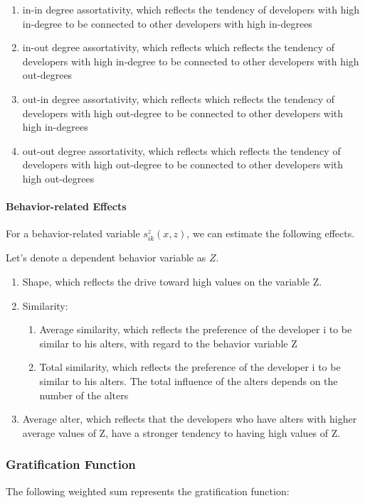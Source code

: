 \documentclass[11pt]{report}
\begin{document}
\begin{enumerate}
\begin{enumerate}
\end{enumerate}

\item{in-in degree assortativity, which reflects the tendency of developers with high in-degree to be connected to other developers with high in-degrees}
\item{in-out degree assortativity, which reflects which reflects the tendency of developers with high in-degree to be connected to other developers with high out-degrees}
\item{out-in degree assortativity, which reflects which reflects the tendency of developers with high out-degree to be connected to other developers with high in-degrees}
\item{out-out degree assortativity, which reflects which reflects the tendency of developers with high out-degree to be connected to other developers with high out-degrees}
\end{enumerate}

\paragraph{Behavior-related Effects\\}
For a behavior-related variable $s_{ik}^z(x,z)$, we can estimate the following effects.

Let's denote a dependent behavior variable as $Z$.
\begin{enumerate}
\item{Shape, which reflects the drive toward high values on the variable Z.}
\item{Similarity:}
\begin{enumerate}
\item{Average similarity, which reflects the preference of the developer i to be similar to his alters, with regard to the behavior variable Z}
\item{Total similarity, which reflects the preference of the developer i to be similar to his alters. The total influence of the alters depends on the number of the alters}
\end{enumerate}
\item{Average alter, which reflects that the developers who have alters with higher average values of Z, have a stronger tendency to having high values of Z.}
\end{enumerate}

\subsubsection{Gratification Function}
The following weighted sum represents the gratification function:
\end{document}
